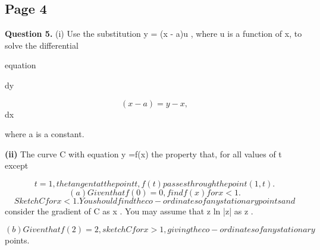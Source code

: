 \documentclass[12pt]{article}
\begin{document}
\subsection*{Page 4}
\begin{flushleft}
\bigskip\textbf{Question 5.} (i) Use the substitution y = (x - a)u , where u is a function of x, to solve the differential\par
equation\par
dy\par
\[(x - a) = y - x ,\]
dx\par
where a is a constant.\par
\textbf{(ii)} The curve C with equation y =\leq f(x) \geqhas the property that, for all values of t except\par
\[t = 1, the tangent at the point t, f(t) passes through the point (1, t).\]
\[(a) Given that f(0) = 0, find f(x) for x < 1.\]
\[Sketch C for x < 1. You should find the co-ordinates of any stationary points and\]
consider the gradient of C as x  . You may assume that z ln |z|  as z  .\par
\[(b) Given that f(2) = 2, sketch C for x > 1, giving the co-ordinates of any stationary\]
points.\par
\end{flushleft}
\end{document}
